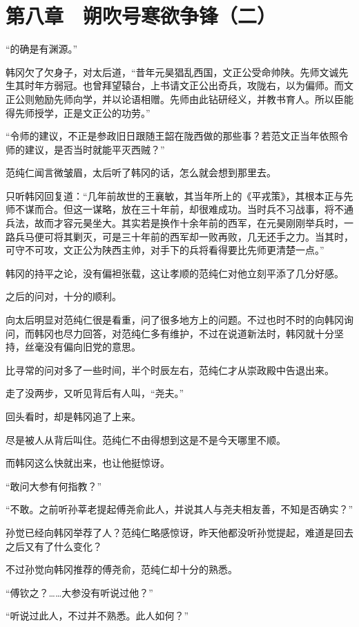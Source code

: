 \section{第八章　朔吹号寒欲争锋（二）}

“的确是有渊源。”

韩冈欠了欠身子，对太后道，“昔年元昊猖乱西国，文正公受命帅陕。先师文诚先生其时年方弱冠。也曾拜望辕台，上书请文正公出奇兵，攻陇右，以为偏师。而文正公则勉励先师向学，并以论语相赠。先师由此钻研经义，并教书育人。所以臣能得先师授学，正是文正公的功劳。”

“令师的建议，不正是参政旧日跟随王韶在陇西做的那些事？若范文正当年依照令师的建议，是否当时就能平灭西贼？”

范纯仁闻言微皱眉，太后听了韩冈的话，怎么就会想到那里去。

只听韩冈回复道：“几年前故世的王襄敏，其当年所上的《平戎策》，其根本正与先师不谋而合。但这一谋略，放在三十年前，却很难成功。当时兵不习战事，将不通兵法，故而才容元昊坐大。其实若是换作十余年前的西军，在元昊刚刚举兵时，一路兵马便可将其剿灭，可是三十年前的西军却一败再败，几无还手之力。当其时，可守不可攻，文正公为陕西主帅，对手下的兵将看得要比先师更清楚一点。”

韩冈的持平之论，没有偏袒张载，这让孝顺的范纯仁对他立刻平添了几分好感。

之后的问对，十分的顺利。

向太后明显对范纯仁很是看重，问了很多地方上的问题。不过也时不时的向韩冈询问，而韩冈也尽力回答，对范纯仁多有维护，不过在说道新法时，韩冈就十分坚持，丝毫没有偏向旧党的意思。

比寻常的问对多了一些时间，半个时辰左右，范纯仁才从崇政殿中告退出来。

走了没两步，又听见背后有人叫，“尧夫。”

回头看时，却是韩冈追了上来。

尽是被人从背后叫住。范纯仁不由得想到这是不是今天哪里不顺。

而韩冈这么快就出来，也让他挺惊讶。

“敢问大参有何指教？”

“不敢。之前听孙莘老提起傅尧俞此人，并说其人与尧夫相友善，不知是否确实？”

孙觉已经向韩冈举荐了人？范纯仁略感惊讶，昨天他都没听孙觉提起，难道是回去之后又有了什么变化？

不过孙觉向韩冈推荐的傅尧俞，范纯仁却十分的熟悉。

“傅钦之？……大参没有听说过他？”

“听说过此人，不过并不熟悉。此人如何？”

